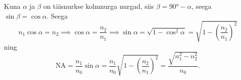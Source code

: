 Kuna $\alpha$ ja $\beta$ on täisnurkse kolmnurga nurgad, siis $\beta = \ang{90} - \alpha$, seega $\sin \beta = \cos \alpha$. Seega
\begin{equation*}
    n_1 \cos\alpha = n_2 \implies \cos \alpha = \frac{n_2}{n_1} \implies \sin\alpha = \sqrt{1-\cos^2\alpha} = \sqrt{1-\left(\frac{n_2}{n_1}\right)^2}
\end{equation*}
ning
\begin{equation*}
    \text{NA} = \frac{n_1}{n_0}\sin\alpha = \frac{n_1}{n_0}\sqrt{1-\left(\frac{n_2}{n_1}\right)^2} = \frac{\sqrt{n_1^2-n_2^2}}{n_0}.
\end{equation*}
\probend